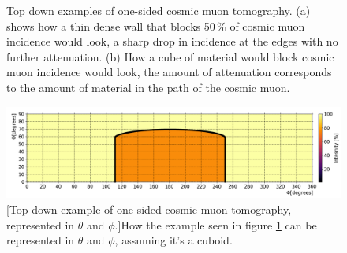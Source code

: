 \begin{figure}[!h]
\begin{subfigure}{.5\textwidth}
  \captionsetup{width=.9\linewidth}
  \caption{}
  \label{subFig:TopDownCircularCubePlot}
\end{subfigure}
\caption[Top down examples of one-sided cosmic muon tomography.]{Top down examples of one-sided cosmic muon tomography. (a) shows how a thin dense wall that blocks 50\,\% of cosmic muon incidence would look, a sharp drop in incidence at the edges with no further attenuation. (b) How a cube of material would block cosmic muon incidence would look, the amount of attenuation corresponds to the amount of material in the path of the cosmic muon.}
\label{fig:TopDownCircularWallCubePlot}
\end{figure}
 
 \begin{figure}[!h]
 \centering
 \includegraphics[width=\linewidth]{Chapter5/Figs/wylfaRasterNew/phiVsThetaExpectedInferno_outlined.png}
 [Top down example of one-sided cosmic muon tomography, represented in $\theta$ and $\phi$.]{How the example seen in figure \ref{subFig:TopDownCircularCubePlot} can be represented in $\theta$ and $\phi$, assuming it's a cuboid.} 
 \label{fig:thetaVsPhiExpectedCube}
\end{figure}

